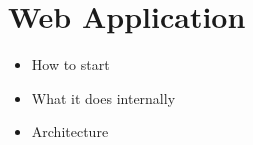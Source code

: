 \section{Web Application}
\label{sec:web}
\begin{itemize}
	\item How to start
	\item What it does internally
	\item Architecture
\end{itemize}

